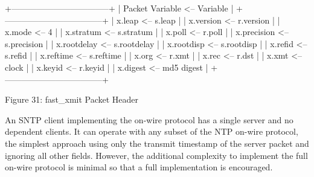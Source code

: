                 +-----------------------------------+
                | Packet Variable <--   Variable    |
                +-----------------------------------+
                | x.leap        <--     s.leap      |
                | x.version     <--     r.version   |
                | x.mode        <--     4           |
                | x.stratum     <--     s.stratum   |
                | x.poll        <--     r.poll      |
                | x.precision   <--     s.precision |
                | x.rootdelay   <--     s.rootdelay |
                | x.rootdisp    <--     s.rootdisp  |
                | x.refid       <--     s.refid     |
                | x.reftime     <--     s.reftime   |
                | x.org         <--     r.xmt       |
                | x.rec         <--     r.dst       |
                | x.xmt         <--     clock       |
                | x.keyid       <--     r.keyid     |
                | x.digest      <--     md5 digest  |
                +-----------------------------------+

                Figure 31: fast\_xmit Packet Header

An SNTP client implementing the on-wire protocol has a single server
and no dependent clients.  It can operate with any subset of the NTP
on-wire protocol, the simplest approach using only the transmit
timestamp of the server packet and ignoring all other fields.
However, the additional complexity to implement the full on-wire
protocol is minimal so that a full implementation is encouraged.
